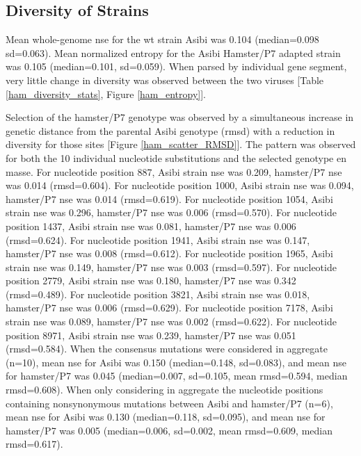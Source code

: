 \subsection{Diversity of Strains}
Mean whole-genome \gls{nse} for the \gls{wt} strain Asibi was 0.104 (median=0.098 \gls{sd}=0.063). Mean normalized entropy for the Asibi Hamster/P7 adapted strain was 0.105 (median=0.101, \gls{sd}=0.059). When parsed by individual gene segment, very little change in diversity was observed between the two viruses [Table \ref{ham_diversity_stats}, Figure \ref{ham_entropy}]. 

Selection of the hamster/P7 genotype was observed by a simultaneous increase in genetic distance from the parental Asibi genotype (\gls{rmsd}) with a reduction in diversity for those sites [Figure \ref{ham_scatter_RMSD}]. The pattern was observed for both the 10 individual nucleotide substitutions and the selected genotype en masse. 
For nucleotide position 887, Asibi strain \gls{nse} was 0.209, hamster/P7 \gls{nse} was 0.014 (\gls{rmsd}=0.604). For nucleotide position 1000, Asibi strain \gls{nse} was 0.094, hamster/P7 \gls{nse} was 0.014 (\gls{rmsd}=0.619). For nucleotide position 1054, Asibi strain \gls{nse} was 0.296, hamster/P7 \gls{nse} was 0.006 (\gls{rmsd}=0.570).  For nucleotide position 1437, Asibi strain \gls{nse} was 0.081, hamster/P7 \gls{nse} was 0.006 (\gls{rmsd}=0.624).  For nucleotide position 1941, Asibi strain \gls{nse} was 0.147, hamster/P7 \gls{nse} was 0.008 (\gls{rmsd}=0.612).  For nucleotide position 1965, Asibi strain \gls{nse} was 0.149, hamster/P7 \gls{nse} was 0.003 (\gls{rmsd}=0.597).  For nucleotide position 2779, Asibi strain \gls{nse} was 0.180, hamster/P7 \gls{nse} was 0.342 (\gls{rmsd}=0.489).  For nucleotide position 3821, Asibi strain \gls{nse} was 0.018, hamster/P7 \gls{nse} was 0.006 (\gls{rmsd}=0.629).  For nucleotide position 7178, Asibi strain \gls{nse} was 0.089, hamster/P7 \gls{nse} was 0.002 (\gls{rmsd}=0.622).  For nucleotide position 8971, Asibi strain \gls{nse} was 0.239, hamster/P7 \gls{nse} was 0.051 (\gls{rmsd}=0.584). 
When the consensus mutations were considered in aggregate (n=10), mean \gls{nse} for Asibi was 0.150 (median=0.148, \gls{sd}=0.083), and mean \gls{nse} for hamster/P7 was 0.045 (median=0.007, \gls{sd}=0.105, mean \gls{rmsd}=0.594, median \gls{rmsd}=0.608). When only considering in aggregate the nucleotide positions containing nonsynonymous mutations between Asibi and hamster/P7 (n=6), mean \gls{nse} for Asibi was 0.130 (median=0.118, \gls{sd}=0.095), and mean \gls{nse} for hamster/P7 was 0.005 (median=0.006, \gls{sd}=0.002, mean \gls{rmsd}=0.609, median \gls{rmsd}=0.617).
